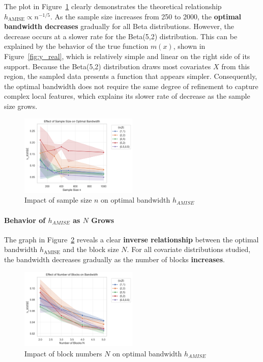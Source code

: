 \documentclass{article}
\begin{document}
The plot in Figure~\ref{fig:sample_size} clearly demonstrates the theoretical relationship \( h_{\text{AMISE}} \propto n^{-1/5} \). As the sample size increases from 250 to 2000, the \textbf{optimal bandwidth decreases} gradually for all Beta distributions. 
However, the decrease occurs at a slower rate for the Beta(5,2) distribution. This can be explained by the behavior of the true function \( m(x) \), shown in Figure~\ref{fig:y_real}, which is relatively simple and linear on the right side of its support. 
Because the Beta(5,2) distribution draws most covariates \( X \) from this region, the sampled data presents a function that appears simpler. Consequently, the optimal bandwidth does not require the same degree of refinement to capture complex local features, 
which explains its slower rate of decrease as the sample size grows.

\begin{figure}[H]
\centering
\includegraphics[width=0.5\textwidth]{plot1_sample_size_effect.png}
\caption{Impact of sample size $n$ on optimal bandwidth $h_{AMISE}$}
\label{fig:sample_size}
\end{figure}


\paragraph{Behavior of $h_{AMISE}$ as $N$ Grows} The graph in Figure~\ref{fig:block_N} reveals a clear \textbf{inverse relationship} between the optimal bandwidth $h_{\text{AMISE}}$ and the block size $N$. For all covariate distributions studied,
the bandwidth decreases gradually as the number of blocks \textbf{increases}.

\begin{figure}[H]
\centering
\includegraphics[width=0.5\textwidth]{plot2_block_size_effect.png}
\caption{Impact of block numbers $N$ on optimal bandwidth $h_{AMISE}$}
\label{fig:block_N}
\end{figure}
\end{document}
